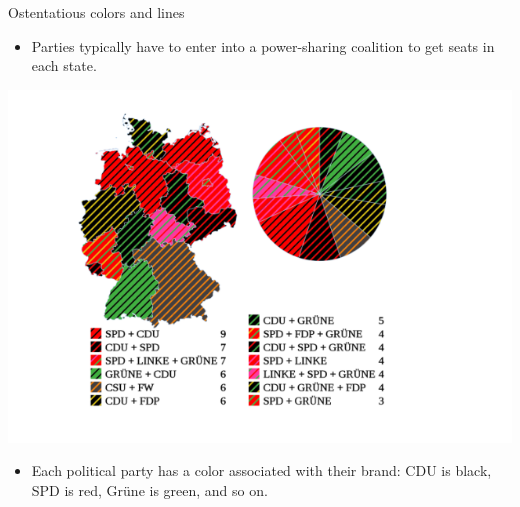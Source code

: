 \documentclass[
  ignorenonframetext,
]{beamer}
\providecommand{\tightlist}{%
  \setlength{\itemsep}{0pt}\setlength{\parskip}{0pt}}
\begin{document}
\begin{frame}{Ostentatious colors and lines}
\label{ostentatious-colors-and-lines-1}
\begin{itemize}
\tightlist
\item
  Parties typically have to enter into a power-sharing coalition to get
  seats in each state.
\end{itemize}

\includegraphics{../images/im117.png}

\begin{itemize}
\tightlist
\item
  Each political party has a color associated with their brand: CDU is
  black, SPD is red, Grüne is green, and so on.
\end{itemize}
\end{frame}
\end{document}
